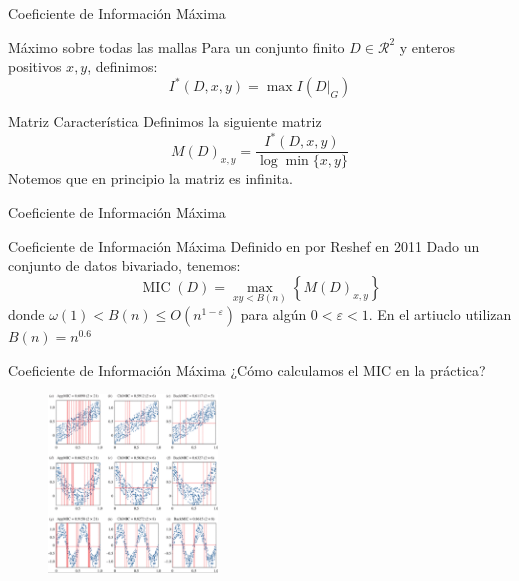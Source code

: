 \documentclass{beamer}
\begin{document}
\begin{frame}{Coeficiente de Información Máxima}
    \begin{block}{Máximo sobre todas las mallas}
        Para un conjunto finito $D\in\mathcal{R}  ^2$ y enteros positivos $x,y$, definimos:
        $$
        I^*(D,x,y)=\max I(D|_G)
        $$
    \end{block}
    \begin{block}{Matriz Característica}
        Definimos la siguiente matriz       
        \begin{equation}
	    	M(D)_{x, y}=\frac{I^{*}(D, x, y)}{\log \min \{x, y\}}
        \end{equation}
        Notemos que en principio la matriz es infinita.
    \end{block}
\end{frame}


\begin{frame}{Coeficiente de Información Máxima}
     
    \begin{block}{Coeficiente de Información Máxima}
        Definido en por Reshef en 2011 Dado un conjunto de datos bivariado, tenemos:
        \begin{equation}
	    	\operatorname{MIC}(D)=\max _{x y<B(n)}\left\{M(D)_{x, y}\right\}
        \end{equation}
        donde $\omega(1)<B(n) \leq O\left(n^{1-\varepsilon}\right)$ para alg\'un $0<\varepsilon<1$. En el artiuclo utilizan $B(n)=n^{0.6}$
    \end{block}
\end{frame}


\begin{frame}{Coeficiente de Información Máxima}
    ¿Cómo calculamos el MIC en la práctica?
    \begin{figure}
        \centering
        \includegraphics[width=0.4\textwidth]{rsos201424f03.png}
    \end{figure}
\end{frame}
\end{document}
